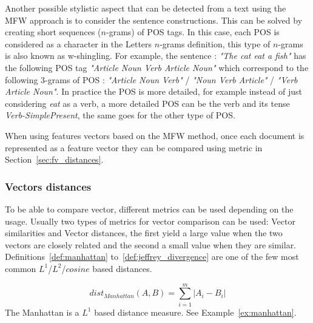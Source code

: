 Another possible stylistic aspect that can be detected from a text using the MFW approach is to consider the sentence constructions.
This can be solved by creating short sequences ($n$-grams) of POS tags.
In this case, each POS is considered as a character in the Letters $n$-grams definition, this type of $n$-grams is also known as w-shingling.
For example, the sentence : \textit{"The cat eat a fish"} has the following POS tag \textit{"Article Noun Verb Article Noun"} which correspond to the following 3-grams of POS : \textit{"Article Noun Verb"} / \textit{"Noun Verb Article"} / \textit{"Verb Article Noun"}.
In practice the POS is more detailed, for example instead of just considering \textit{eat} as a verb, a more detailed POS can be the verb and its tense \textit{Verb-SimplePresent}, the same goes for the other type of POS.

When using features vectors based on the MFW method, once each document is represented as a feature vector they can be compared using metric in Section~\ref{sec:fv_distances}.

\subsubsection{Vectors distances \label{sec:fv_distances}}

To be able to compare vector, different metrics can be used depending on the usage.
Usually two types of metrics for vector comparison can be used: Vector similarities and Vector distances, the first yield a large value when the two vectors are closely related and the second a small value when they are similar.
Definitions~\ref{def:manhattan} to~\ref{def:jeffrey_divergence} are one of the few most common $L^1$/$L^2$/$cosine$ based distances.

\begin{definition}
  \begin{equation}
    dist_{Manhattan}(A, B) = \sum_{i=1}^{m} |A_i - B_i|
  \end{equation}
  The Manhattan is a $L^1$ based distance measure. See Example~\ref{ex:manhattan}.
\end{definition}

